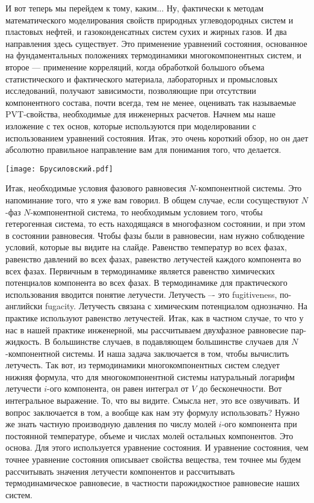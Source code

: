 \documentclass[main.tex]{subfiles}
\begin{document}
И вот теперь мы перейдем к тому, каким...
Ну, фактически к методам математического моделирования свойств природных углеводородных систем и пластовых нефтей, и газоконденсатных систем сухих и жирных газов.
И два направления здесь существует.
Это применение уравнений состояния, основанное на фундаментальных положениях термодинамики многокомпонентных систем, и второе — применение корреляций, когда обработкой большого объема статистического и фактического материала, лабораторных и промысловых исследований, получают зависимости, позволяющие при отсутствии компонентного состава, почти всегда, тем не менее, оценивать так называемые PVT-свойства, необходимые для инженерных расчетов.
Начнем мы наше изложение с тех основ, которые используются при моделировании с использованием уравнений состояния.
Итак, это очень короткий обзор, но он дает абсолютно правильное направление вам для понимания того, что делается.

\begin{center}
\texttt{[image: Брусиловский.pdf]}
\end{center}

Итак, необходимые условия фазового равновесия $N$-компонентной системы.
Это напоминание того, что я уже вам говорил.
В общем случае, если сосуществуют $N$-фаз $N$-компонентной система, то необходимым условием того, чтобы гетерогенная система, то есть находящаяся в многофазном состоянии, и при этом в состоянии равновесия.
Чтобы фазы были в равновесии, нам нужно соблюдение условий, которые вы видите на слайде.
Равенство температур во всех фазах, равенство давлений во всех фазах, равенство летучестей каждого компонента во всех фазах.
Первичным в термодинамике является равенство химических потенциалов компонента во всех фазах.
В термодинамике для практического использования вводится понятие летучести.
Летучесть –- это fugitiveness, по-английски fugacity.
Летучесть связана с химическим потенциалом однозначно.
На практике используют равенство летучестей.
Итак, как в частном случае, то что у нас в нашей практике инженерной, мы рассчитываем двухфазное равновесие пар-жидкость.
В большинстве случаев, в подавляющем большинстве случаев для $N$-компонентной системы.
И наша задача заключается в том, чтобы вычислить летучесть.
Так вот, из термодинамики многокомпонентных систем следует нижняя формула, что для многокомпонентной системы натуральный логарифм летучести $i$-ого компонента, он равен интеграл от $V$ до бесконечности.
Вот интегральное выражение.
То, что вы видите.
Смысла нет, это все озвучивать.
И вопрос заключается в том, а вообще как нам эту формулу использовать?
Нужно же знать частную производную давления по числу молей $i$-ого компонента при постоянной температуре, объеме и числах молей остальных компонентов.
Это основа.
Для этого используется уравнение состояния.
И уравнение состояния, чем точнее уравнение состояния описывает свойства вещества, тем точнее мы будем рассчитывать значения летучести компонентов и рассчитывать термодинамическое равновесие, в частности парожидкостное равновесие наших систем.
\end{document}
